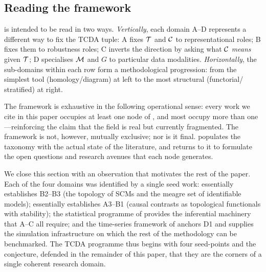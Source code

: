 \subsection{Reading the framework}\label{sec:reading}

 is intended to be read in two ways. \emph{Vertically},
each domain A--D represents a different way to fix the TCDA tuple: A
fixes $\mathcal{T}$ and $\mathcal{C}$ to representational roles; B fixes them to
robustness roles; C inverts the direction by asking what
$\mathcal{C}$ \emph{means} given $\mathcal{T}$; D specialises $\mathcal{M}$ and $G$ to
particular data modalities. \emph{Horizontally}, the sub-domains within
each row form a methodological progression: from the simplest tool
(homology/diagram) at left to the most structural (functorial/
stratified) at right.

The framework is exhaustive in the following operational sense: every
work we cite in this paper occupies at least one node of
, and most occupy more than one---reinforcing the
claim that the field is real but currently fragmented. The framework is
not, however, mutually exclusive; nor is it final. 
populates the taxonomy with the actual state of the literature, and
 returns to it to formulate the open questions and
research avenues that each node generates.

We close this section with an observation that motivates the rest of
the paper. Each of the four domains was identified by a single seed
work: \citet{ibeling2021topological} essentially establishes B2--B3 (the
topology of SCMs and the meagre set of identifiable models);
\citet{kim2026topological} essentially establishes A3--B1 (causal
contrasts as topological functionals with stability); the statistical
programme of \citet{lecci2014statistical} provides the inferential
machinery that A--C all require; and the time-series framework of
\citet{elyaagoubi2023statistical} anchors D1 and supplies the
simulation infrastructure on which the rest of the methodology can be
benchmarked. The TCDA programme thus begins with four seed-points and
the conjecture, defended in the remainder of this paper, that they are
the corners of a single coherent research domain.
